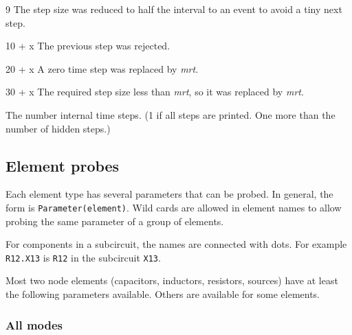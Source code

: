 \begin{description}
\begin{description}
\item{9} The step size was reduced to half the interval to an event 
to avoid a tiny next step.

\item{10 + x} The previous step was rejected.

\item{20 + x} A zero time step was replaced by {\it mrt}.

\item{30 + x} The required step size less than {\it mrt}, so it was 
replaced by {\it mrt}.

\end{description}

\item[{\tt Control(1)}] The number internal time steps.  (1 if all steps are
printed.  One more than the number of hidden steps.)

\end{description}
\subsection{Element probes}

Each element type has several parameters that can be probed.  In general,
the form is {\tt Parameter(element)}.  Wild cards are allowed in element
names to allow probing the same parameter of a group of elements.

For components in a subcircuit, the names are connected with dots.  For
example {\tt R12.X13} is {\tt R12} in the subcircuit {\tt X13}.

Most two node elements (capacitors, inductors, resistors, sources) have at
least the following parameters available.  Others are available for some
elements.
\subsubsection{All modes}

